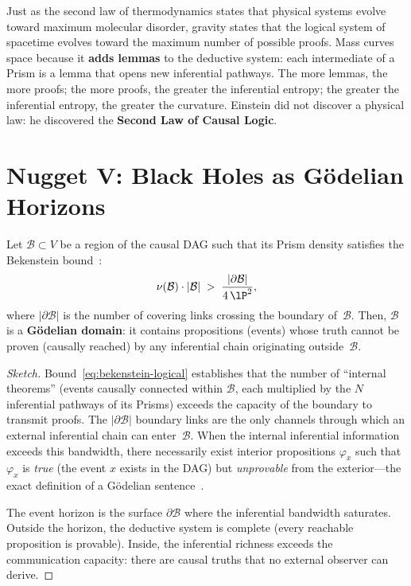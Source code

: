 \begin{result}[title={Gravity as the Second Law of
Logic}]
\label{res:stone-gravity-logic}
Just as the second law of thermodynamics states that
physical systems evolve toward maximum molecular disorder,
gravity states that the logical system of spacetime
evolves toward the maximum number of possible proofs.
Mass curves space because it \textbf{adds lemmas} to the
deductive system: each intermediate of a Prism is a lemma that opens new
inferential pathways. The more lemmas, the more proofs;
the more proofs, the greater the inferential entropy; the greater
the inferential entropy, the greater the curvature. Einstein did not discover a
physical law: he discovered the \textbf{Second Law of
Causal Logic}.
\end{result}

\section{Nugget V: Black Holes as G\"odelian Horizons}

\begin{theorem}
\label{thm:godel-horizon}
Let $\mathcal{B} \subset V$ be a region of the causal DAG such that its
Prism density satisfies the Bekenstein
bound~\cite{bekenstein1981}:
\begin{equation}
  \nu(\mathcal{B}) \cdot |\mathcal{B}|
  \;>\;
  \frac{|\partial \mathcal{B}|}{4\,\lP^2},
  \label{eq:bekenstein-logical}
\end{equation}
where $|\partial \mathcal{B}|$ is the number of covering links
crossing the boundary of~$\mathcal{B}$. Then,
$\mathcal{B}$ is a \textbf{G\"odelian domain}: it contains
propositions (events) whose truth cannot be proven
(causally reached) by any inferential chain originating
outside~$\mathcal{B}$.
\end{theorem}

\begin{proof}[Sketch]
Bound~\eqref{eq:bekenstein-logical} establishes that the number of
``internal theorems'' (events causally connected within
$\mathcal{B}$, each multiplied by the $N$ inferential pathways
of its Prisms) exceeds the capacity of the boundary to
transmit proofs. The $|\partial \mathcal{B}|$ boundary links
are the only channels through which an external inferential
chain can enter~$\mathcal{B}$. When the internal inferential
information exceeds this bandwidth, there necessarily exist
interior propositions $\varphi_x$ such that
$\varphi_x$ is \emph{true} (the event $x$ exists in the DAG)
but \emph{unprovable} from the exterior---the exact definition
of a G\"odelian sentence~\cite{godel1931}.

The event horizon is the surface $\partial \mathcal{B}$ where
the inferential bandwidth saturates. Outside the horizon, the
deductive system is complete (every reachable proposition is
provable). Inside, the inferential richness exceeds the
communication capacity: there are causal truths that no external observer
can derive.
\end{proof}

